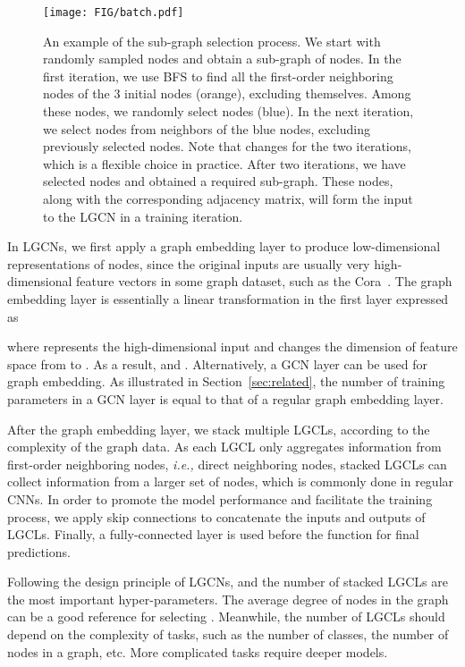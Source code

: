 \documentclass[sigconf]{acmart}
\begin{document}
\begin{figure}[t] \texttt{[image: FIG/batch.pdf]}
\caption{An example of the sub-graph selection process. We start
with  randomly sampled nodes and obtain a sub-graph of
 nodes. In the first iteration, we use BFS to find all the
first-order neighboring nodes of the 3 initial nodes (orange),
excluding themselves. Among these nodes, we randomly select 
nodes (blue). In the next iteration, we select  nodes from
neighbors of the blue nodes, excluding previously selected nodes.
Note that  changes for the two iterations, which is a flexible
choice in practice. After two iterations, we have selected
 nodes and obtained a required sub-graph. These nodes,
along with the corresponding adjacency matrix, will form the input
to the LGCN in a training iteration.} \label{fig:batch}
\end{figure}

In LGCNs, we first apply a graph embedding layer to produce
low-dimensional representations of nodes, since the original inputs
are usually very high-dimensional feature vectors in some graph
dataset, such as the Cora~\cite{sen2008collective}. The graph
embedding layer is essentially a linear transformation in the first
layer expressed as

where  represents the
high-dimensional input and 
changes the dimension of feature space from  to . As a
result,  and .
Alternatively, a GCN layer can be used for graph embedding. As
illustrated in Section~\ref{sec:related}, the number of training
parameters in a GCN layer is equal to that of a regular graph
embedding layer.


After the graph embedding layer, we stack multiple LGCLs, according
to the complexity of the graph data. As each LGCL only aggregates
information from first-order neighboring nodes, \emph{i.e.,} direct
neighboring nodes, stacked LGCLs can collect information from a
larger set of nodes, which is commonly done in regular CNNs. In
order to promote the model performance and facilitate the training
process, we apply skip connections to concatenate the inputs and
outputs of LGCLs. Finally, a fully-connected layer is used before
the  function for final predictions.


Following the design principle of LGCNs,  and the number of
stacked LGCLs are the most important hyper-parameters. The average
degree of nodes in the graph can be a good reference for selecting
. Meanwhile, the number of LGCLs should depend on the complexity
of tasks, such as the number of classes, the number of nodes in a
graph, etc. More complicated tasks require deeper models.
\end{document}
